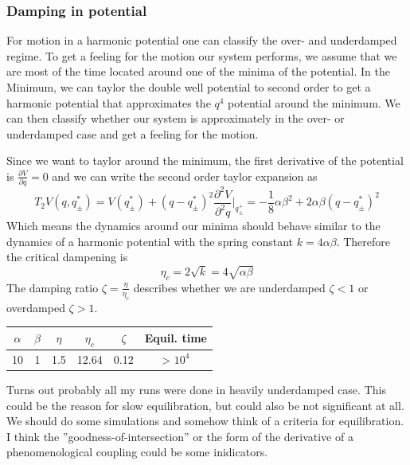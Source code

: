 	\subsubsection{Damping in potential}
	For motion in a harmonic potential one can classify the over- and underdamped regime. To get a feeling for the motion our system performs, we assume that we are most of the time located around one of the minima of the potential. In the Minimum, we can taylor the double well potential to second order to get a harmonic potential that approximates the $q^4$ potential around the minimum. We can then classify whether our system is approximately in the over- or underdamped case and get a feeling for the motion.
	
	Since we want to taylor around the minimum, the first derivative of the potential is $\frac{\partial V}{\partial q} =	0$ and we can write the second order taylor expansion as
	\begin{equation}
		T_2 V(q, q^*_\pm) =	V(q^*_\pm) + \left(q -q^*_\pm \right)^2 \frac{\partial^2 V}{\partial^2 q} \Big |_{q^+_\pm} =	- \frac{1}{8} \alpha \beta^2 + 2 \alpha \beta \left(q -q^*_\pm \right)^2
	\end{equation}
	Which means the dynamics around our minima should behave similar to the dynamics of a harmonic potential with the spring constant $k =	4 \alpha \beta$. Therefore the critical dampening is
	\begin{equation}
		\eta_c =	2 \sqrt{k} =	4 \sqrt{\alpha \beta}
	\end{equation}
	The damping ratio $\zeta =	\frac{\eta}{\eta_c}$ describes whether we are underdamped $\zeta < 1$ or overdamped $\zeta > 1$.
	\begin{center}
		\begin{tabular}{ c c c c c c}
			$\alpha$ & $\beta$& $\eta$ & $\eta_c$ & $\zeta$ & Equil. time \\
			\hline
			10 & 1 & 1.5  & 12.64 & 0.12 & > $10^4$\\
		\end{tabular}
	\end{center}
	Turns out probably all my runs were done in heavily underdamped case. This could be the reason for slow equilibration, but could also be not significant at all. We should do some simulations and somehow think of a criteria for equilibration. I think the ''goodness-of-intersection'' or the form of the derivative of a phenomenological coupling could be some inidicators.
